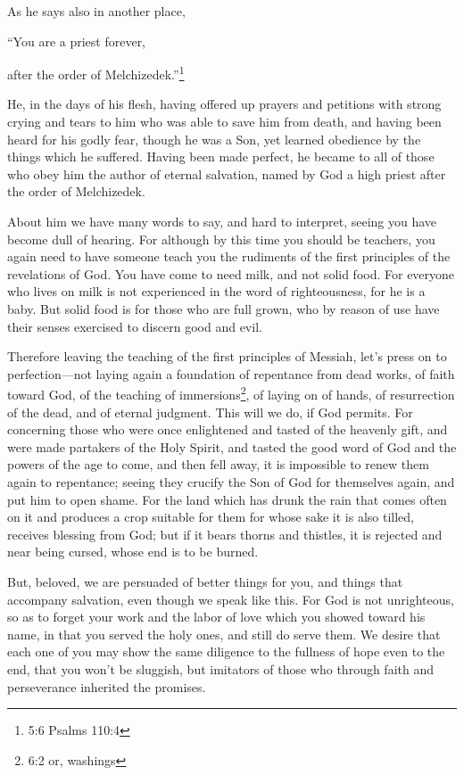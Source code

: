 \myverse{}As he says also in another place,

“You are a priest forever,

after the order of Melchizedek.”\footnote{5:6 Psalms 110:4}

\myverse{}He, in the days of his flesh, having offered up prayers and petitions
with strong crying and tears to him who was able to save him from death, and having been heard for his
godly fear,
\myverse{}though he was a Son, yet learned obedience by the things which he suffered.
\myverse{}Having been made perfect, he became to all of those who obey him the author
of eternal salvation,
\myverse{}named by God a high priest after the order of Melchizedek.

\myverse{}About him we have many words to say, and hard to interpret, seeing
you have become dull of hearing.
\myverse{}For although by this time you should be teachers, you again need to have someone
teach you the rudiments of the first principles of the revelations of God. You have come to need milk,
and not solid food.
\myverse{}For everyone who lives on milk is not experienced in the word of righteousness,
for he is a baby.
\myverse{}But solid food is for those who are full grown, who by reason of use have
their senses exercised to discern good and evil.


\mychapter{} \myverse*{}Therefore leaving the teaching of the first principles of Messiah,
let’s press on to perfection—not laying again a foundation of repentance from dead works, of faith toward
God,
\myverse{}of the teaching of immersions\footnote{6:2 or, washings}, of laying on of
hands, of resurrection of the dead, and of eternal judgment.
\myverse{}This will we do, if God permits.
\myverse{}For concerning those who were once enlightened and tasted of the heavenly gift,
and were made partakers of the Holy Spirit,
\myverse{}and tasted the good word of God and the powers of the age to come,
\myverse{}and then fell away, it is impossible to renew them again to repentance; seeing
they crucify the Son of God for themselves again, and put him to open shame.
\myverse{}For the land which has drunk the rain that comes often on it and produces a
crop suitable for them for whose sake it is also tilled, receives blessing from God;
\myverse{}but if it bears thorns and thistles, it is rejected and near being cursed, whose
end is to be burned.

\myverse{}But, beloved, we are persuaded of better things for you, and things
that accompany salvation, even though we speak like this.
\myverse{}For God is not unrighteous, so as to forget your work and the labor of love
which you showed toward his name, in that you served the holy ones, and still do serve them.
\myverse{}We desire that each one of you may show the same diligence to the fullness
of hope even to the end,
\myverse{}that you won’t be sluggish, but imitators of those who through faith and perseverance
inherited the promises.

